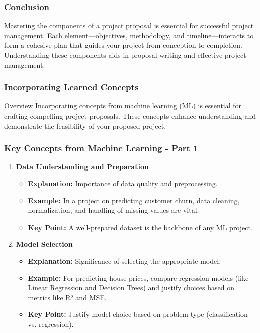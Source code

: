 \documentclass[aspectratio=169]{beamer}
\begin{document}
\begin{frame}[fragile]
    \frametitle{Conclusion}
    Mastering the components of a project proposal is essential for successful project management. Each element—objectives, methodology, and timeline—interacts to form a cohesive plan that guides your project from conception to completion. Understanding these components aids in proposal writing and effective project management.
\end{frame}

\begin{frame}[fragile]
    \frametitle{Incorporating Learned Concepts}
    \begin{block}{Overview}
        Incorporating concepts from machine learning (ML) is essential for crafting compelling project proposals. These concepts enhance understanding and demonstrate the feasibility of your proposed project.
    \end{block}
\end{frame}

\begin{frame}[fragile]
    \frametitle{Key Concepts from Machine Learning - Part 1}
    \begin{enumerate}
        \item \textbf{Data Understanding and Preparation}
        \begin{itemize}
            \item \textbf{Explanation:} Importance of data quality and preprocessing.
            \item \textbf{Example:} In a project on predicting customer churn, data cleaning, normalization, and handling of missing values are vital.
            \item \textbf{Key Point:} A well-prepared dataset is the backbone of any ML project.
        \end{itemize}

        \item \textbf{Model Selection}
        \begin{itemize}
            \item \textbf{Explanation:} Significance of selecting the appropriate model.
            \item \textbf{Example:} For predicting house prices, compare regression models (like Linear Regression and Decision Trees) and justify choices based on metrics like R² and MSE.
            \item \textbf{Key Point:} Justify model choice based on problem type (classification vs. regression).
        \end{itemize}
    \end{enumerate}
\end{frame}
\end{document}
